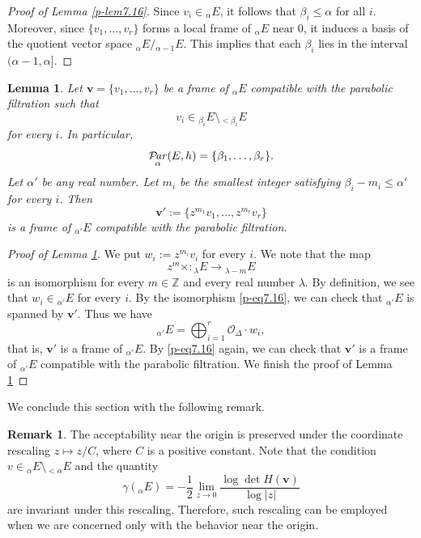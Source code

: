 \documentclass[12pt,twoside]{amsart}
\DeclareMathOperator{\Par}{\mathcal{P}\!\it{ar}}
\newtheorem{lem}[thm]{Lemma}
\theoremstyle{definition}
\newtheorem{rem}[thm]{Remark}
\begin{document}
\begin{proof}[Proof of Lemma \ref{p-lem7.16}] 
Since $v_i \in {}_\alpha E$, it follows that 
$\beta_i \leq \alpha$ for all $i$.  
Moreover, since $\{v_1, \ldots, v_r\}$ forms 
a local frame of ${}_\alpha E$ near $0$, it induces a basis of the quotient vector space 
${}_\alpha E / {}_{\alpha - 1} E$.  
This implies that each $\beta_i$ lies in the interval $(\alpha - 1, \alpha]$. 
\end{proof}

\begin{lem}\label{p-lem7.17}
Let $\bm{v}=\{v_1, \ldots, v_r\}$ be a frame of ${}_\alpha E$ compatible with 
the parabolic filtration such that 
\[
v_i\in {}_{\beta_i}E\setminus {}_{<\beta_i}E 
\] 
for every $i$. 
In particular, 
\[
\Par _{\alpha}(E, h)=\{\beta_1, \ldots, \beta_r\}. 
\]
Let $\alpha'$ be any real number. 
Let $m_i$ be the smallest integer satisfying $\beta_i-m_i\leq 
\alpha'$ for every $i$. 
Then 
\[
\bm{v}':=\{z^{m_1}v_1, \ldots, z^{m_r}v_r\}
\] 
is a frame of ${}_{\alpha'} E$ compatible 
with the parabolic filtration. 
\end{lem}

\begin{proof}[Proof of Lemma \ref{p-lem7.17}]
We put $w_i:=z^{m_i}v_i$ for every $i$. 
We note that the map 
\begin{equation}\label{p-eq7.16}
z^m\times \colon {}_\lambda E\to {}_{\lambda-m} E
\end{equation} 
is an isomorphism for every $m\in \mathbb Z$ and 
every real number $\lambda$. By definition, 
we see that $w_i\in {}_{\alpha'} E$ for every $i$. 
By the isomorphism \eqref{p-eq7.16}, we can check 
that ${}_{\alpha'} E$ is spanned by $\bm v'$. 
Thus we have 
\[
{}_{\alpha'}E=\bigoplus _{i=1}^r \mathcal O_{\Delta}\cdot w_i, 
\] 
that is, $\bm v'$ is a frame of ${}_{\alpha'}E$. 
By \eqref{p-eq7.16} again, 
we can check that $\bm v'$ is a frame 
of ${}_{\alpha'} E$ compatible with the parabolic 
filtration. 
We finish the proof of Lemma \ref{p-lem7.17}
\end{proof}

We conclude this section with the following remark.

\begin{rem}\label{p-rem7.18}
The acceptability near the origin  
is preserved under the coordinate  
rescaling \( z \mapsto z/C \), where \( C \) is a positive constant.  
Note that the condition  
\( v \in {}_\alpha E \setminus {}_{<\alpha} E \) and  
the quantity  
\[
\gamma({}_\alpha E) = -\frac{1}{2} \lim_{z \to 0} \frac{\log \det H(\bm{v})}{\log |z|} 
\]  
are invariant under this rescaling.  
Therefore, such rescaling  
can be employed when we are concerned only with the behavior near the origin.
\end{rem}
\end{document}
